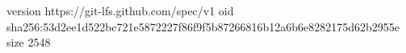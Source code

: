 version https://git-lfs.github.com/spec/v1
oid sha256:53d2ee1d522bc721e5872227f86f9f5b87266816b12a6b6e8282175d62b2955e
size 2548
